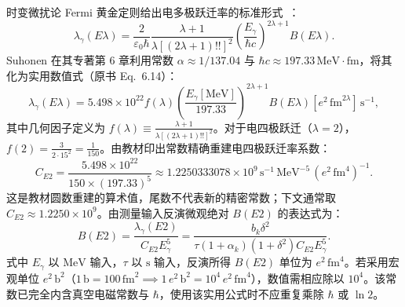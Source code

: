 时变微扰论 Fermi 黄金定则给出电多极跃迁率的标准形式~\cite{book-suhonen-from-nucleons-to-nucleus}：
\begin{equation}\label{eq:5-9-lambda-el}
\lambda_\gamma(E\lambda) = \frac{2}{\varepsilon_0 \hbar} \frac{\lambda + 1}{\lambda [(2\lambda + 1)!!]^2} \left(\frac{E_\gamma}{\hbar c}\right)^{2\lambda + 1} B(E\lambda).
\end{equation}
Suhonen 在其专著第 6 章利用常数 $\alpha \approx 1/137.04$ 与 $\hbar c \approx 197.33\,\text{MeV}\cdot\text{fm}$，将其化为实用数值式（原书 Eq.~6.14）：
\begin{equation}\label{eq:5-9-suhonen-e}
\lambda_\gamma(E\lambda) = 5.498 \times 10^{22} f(\lambda) \left(\frac{E_\gamma[\text{MeV}]}{197.33}\right)^{2\lambda + 1} B(E\lambda)[e^2\,\text{fm}^{2\lambda}]\,\text{s}^{-1},
\end{equation}
其中几何因子定义为 $f(\lambda) \equiv \frac{\lambda + 1}{\lambda [(2\lambda + 1)!!]^2}$。对于电四极跃迁（$\lambda = 2$），$f(2) = \frac{3}{2 \cdot 15^2} = \frac{1}{150}$。由教材印出常数精确重建电四极跃迁率系数：
\begin{equation}\label{eq:5-9-ce2}
C_{E2} = \frac{5.498 \times 10^{22}}{150 \times (197.33)^5} \approx 1.2250333078 \times 10^9\,\text{s}^{-1}\,\text{MeV}^{-5}\,(e^2\,\text{fm}^4)^{-1}.
\end{equation}
这是教材圆数重建的算术值，尾数不代表新的精密常数；下文通常取 $C_{E2} \approx 1.2250 \times 10^9$。由测量输入反演微观绝对 $B(E2)$ 的表达式为：
\begin{equation}\label{eq:5-9-be2-extracted}
B(E2) = \frac{\lambda_\gamma(E2)}{C_{E2} E_\gamma^5} = \frac{b_k \delta^2}{\tau (1 + \alpha_k)(1 + \delta^2) C_{E2} E_\gamma^5}.
\end{equation}
式中 $E_\gamma$ 以 $\text{MeV}$ 输入，$\tau$ 以 $\text{s}$ 输入，反演所得 $B(E2)$ 单位为 $e^2\,\text{fm}^4$。若采用宏观单位 $e^2\,\text{b}^2$（$1\,\text{b} = 100\,\text{fm}^2 \implies 1\,e^2\,\text{b}^2 = 10^4\,e^2\,\text{fm}^4$），数值需相应除以 $10^4$。该常数已完全内含真空电磁常数与 $\hbar$，使用该实用公式时不应重复乘除 $\hbar$ 或 $\ln 2$。

